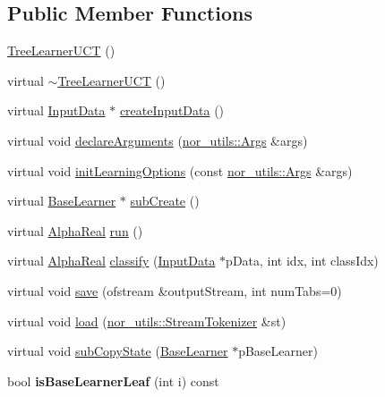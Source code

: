 \subsection*{Public Member Functions}
\begin{DoxyCompactItemize}
\item 
\hyperlink{classMultiBoost_1_1TreeLearnerUCT_a459738a123a9e572856db564a4b5f27d}{TreeLearnerUCT} ()
\item 
virtual \hyperlink{classMultiBoost_1_1TreeLearnerUCT_a9b7a0bfafa65a12ead0f31bb52b28003}{$\sim$TreeLearnerUCT} ()
\item 
virtual \hyperlink{classMultiBoost_1_1InputData}{InputData} $\ast$ \hyperlink{classMultiBoost_1_1TreeLearnerUCT_a1af2ca03219b592798e8d7f1c8a5d451}{createInputData} ()
\item 
virtual void \hyperlink{classMultiBoost_1_1TreeLearnerUCT_a828445ca0839e251cad66e1f779cbdce}{declareArguments} (\hyperlink{classnor__utils_1_1Args}{nor\_\-utils::Args} \&args)
\item 
virtual void \hyperlink{classMultiBoost_1_1TreeLearnerUCT_ae57c244a76db59957b6f188ebdc53afa}{initLearningOptions} (const \hyperlink{classnor__utils_1_1Args}{nor\_\-utils::Args} \&args)
\item 
virtual \hyperlink{classMultiBoost_1_1BaseLearner}{BaseLearner} $\ast$ \hyperlink{classMultiBoost_1_1TreeLearnerUCT_af51e4db05437810a73b7b5d63a4660a4}{subCreate} ()
\item 
virtual \hyperlink{Defaults_8h_a80184c4fd10ab70a1a17c5f97dcd1563}{AlphaReal} \hyperlink{classMultiBoost_1_1TreeLearnerUCT_ae6fa0bb181e98936fdf20068a9c1bff0}{run} ()
\item 
virtual \hyperlink{Defaults_8h_a80184c4fd10ab70a1a17c5f97dcd1563}{AlphaReal} \hyperlink{classMultiBoost_1_1TreeLearnerUCT_a7eb34accb084244812130da690140f41}{classify} (\hyperlink{classMultiBoost_1_1InputData}{InputData} $\ast$pData, int idx, int classIdx)
\item 
virtual void \hyperlink{classMultiBoost_1_1TreeLearnerUCT_ac0b2de0b964bba5700b73b36c532e4c7}{save} (ofstream \&outputStream, int numTabs=0)
\item 
virtual void \hyperlink{classMultiBoost_1_1TreeLearnerUCT_ab4bfec66f1b93942e75c5c5c76cfc5c4}{load} (\hyperlink{classnor__utils_1_1StreamTokenizer}{nor\_\-utils::StreamTokenizer} \&st)
\item 
virtual void \hyperlink{classMultiBoost_1_1TreeLearnerUCT_acb8454466d6b97c03273378ad7b83e45}{subCopyState} (\hyperlink{classMultiBoost_1_1BaseLearner}{BaseLearner} $\ast$pBaseLearner)
\item 
\hypertarget{classMultiBoost_1_1TreeLearnerUCT_a55d64cb4e68792b18068d829dd639298}{
bool {\bfseries isBaseLearnerLeaf} (int i) const }
\label{classMultiBoost_1_1TreeLearnerUCT_a55d64cb4e68792b18068d829dd639298}

\end{DoxyCompactItemize}

